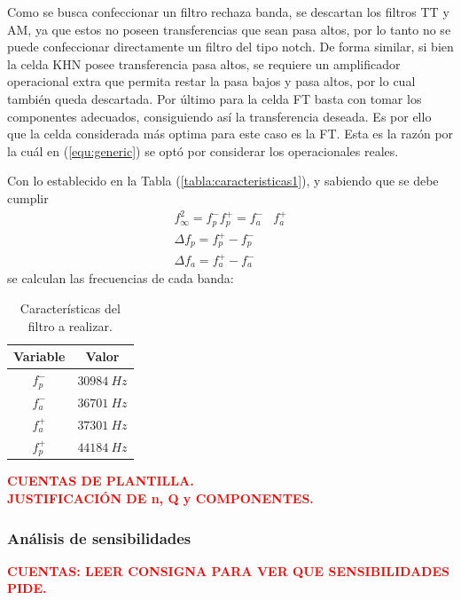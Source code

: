 Como se busca confeccionar un filtro rechaza banda, se descartan los filtros TT y AM, ya que estos no poseen transferencias que sean pasa altos, por lo tanto no se puede confeccionar directamente un filtro del tipo notch. De forma similar, si bien la celda KHN posee transferencia pasa altos, se requiere un amplificador operacional extra que permita restar la pasa bajos y pasa altos, por lo cual también queda descartada. Por último para la celda FT basta con tomar los componentes adecuados, consiguiendo así la transferencia deseada. Es por ello que la celda considerada más optima para este caso es la FT. Esta es la razón por la cuál en (\ref{equ:generic}) se optó por considerar los operacionales reales.

Con lo establecido en la Tabla (\ref{tabla:caracteristicas1}), y sabiendo que se debe cumplir
\begin{equation}
\begin{split}
	f_{\infty}^{2} = f_{p}^{-} f_{p}^{+} = f_{a}^{-} & f_{a}^{+} \\
	\Delta f_p = f_{p}^{+} - f_{p}^{-} \\
	\Delta f_a = f_{a}^{+} - f_{a}^{-} 
\end{split}
\end{equation}
se calculan las frecuencias de cada banda:
\begin{table}[H]
\centering
\begin{tabular}{cc}
\hline
\textbf{Variable} & \textbf{Valor} \\
\hline
$f_{p}^{-}$ & $30984 \ Hz$ \\
$f_{a}^{-}$ & $36701 \ Hz$ \\
$f_{a}^{+}$ & $37301 \ Hz$ \\
$f_{p}^{+}$ & $44184\ Hz$ \\
\hline
\end{tabular}
\caption{Características del filtro a realizar.}
\label{tabla:caracteristicas2}
\end{table}

\begin{center}
	\Large{\textbf{\textcolor{red}{CUENTAS DE PLANTILLA. \\ JUSTIFICACIÓN DE n, Q y COMPONENTES.}}}
\end{center}

\subsubsection{Análisis de sensibilidades}
\begin{center}
	\Large{\textbf{\textcolor{red}{CUENTAS: LEER CONSIGNA PARA VER QUE SENSIBILIDADES PIDE.}}}
\end{center}

